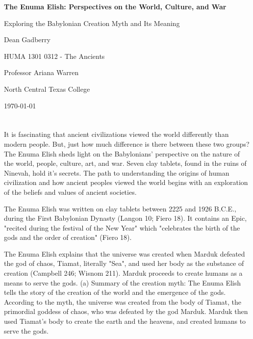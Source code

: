 \documentclass[12pt,a4paper,english]{article}
\begin{document}
\begin{titlepage}
  \begin{center}
    \vspace*{\fill}
    \textbf{The Enuma Elish: Perspectives on the World, Culture, and War}
    \par
    Exploring the Babylonian Creation Myth and Its Meaning
    \par
    Dean Gadberry
    \vspace*{\fill}
    \hfill

       HUMA 1301 0312 - The Ancients 
       \par
       Professor Ariana Warren
       \par
       North Central Texas College
       \par
       \today
  \end{center}
\end{titlepage}
\newpage
{} %
\sloppy

\section*{}
It is fascinating that ancient civilizations viewed the world differently than modern people. But, just how much difference is there between these two groups?
The Enuma Elish sheds light on the Babylonians' perspective on the nature of the world, people, culture, art, and war.
Seven clay tablets, found in the ruins of Ninevah, hold it's secrets.
The path to understanding the origins of human civilization and how ancient peoples viewed the world begins with an exploration of the beliefs and values of ancient societies. 

The Enuma Elish was written on clay tablets between 2225 and 1926 B.C.E., during the First Babylonian Dynasty (Langon 10; Fiero 18).
It contains an Epic, "recited during the festival of the New Year" which "celebrates the birth of the gods and the order of creation" (Fiero 18).

The Enuma Elish explains that the universe was created when Marduk defeated the god of chaos, Tiamat, literally "Sea", and used her body as the substance of creation (Campbell 246; Wisnom 211).
Marduk proceeds to create humans as a means to serve the gods. 
(a) Summary of the creation myth: The Enuma Elish tells the story of the creation of the world and the emergence of the gods. 
According to the myth, the universe was created from the body of Tiamat, the primordial goddess of chaos, who was defeated by the god Marduk. 
Marduk then used Tiamat's body to create the earth and the heavens, and created humans to serve the gods.
\end{document}
